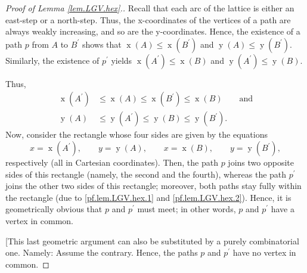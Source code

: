 \documentclass[reqno]{amsart}%
\newcommand{\0}{\phantom{c}}
\theoremstyle{plain}
\theoremstyle{definition}
\numberwithin{equation}{section}
\begin{document}
\begin{proof}
[Proof of Lemma \ref{lem.LGV.hex}.]Recall that each arc of the lattice is
either an east-step or a north-step. Thus, the x-coordinates of the vertices
of a path are always weakly increasing, and so are the y-coordinates. Hence,
the existence of a path $p$ from $A$ to $B^{\prime}$ shows that
$\operatorname*{x}\left(  A\right)  \leq\operatorname*{x}\left(  B^{\prime
}\right)  $ and $\operatorname*{y}\left(  A\right)  \leq\operatorname*{y}%
\left(  B^{\prime}\right)  $. Similarly, the existence of $p^{\prime}$ yields
$\operatorname*{x}\left(  A^{\prime}\right)  \leq\operatorname*{x}\left(
B\right)  $ and $\operatorname*{y}\left(  A^{\prime}\right)  \leq
\operatorname*{y}\left(  B\right)  $.

Thus,%
\begin{align}
\operatorname*{x}\left(  A^{\prime}\right)   &  \leq\operatorname*{x}\left(
A\right)  \leq\operatorname*{x}\left(  B^{\prime}\right)  \leq
\operatorname*{x}\left(  B\right)  \qquad\text{and}\label{pf.lem.LGV.hex.1}\\
\operatorname*{y}\left(  A\right)   &  \leq\operatorname*{y}\left(  A^{\prime
}\right)  \leq\operatorname*{y}\left(  B\right)  \leq\operatorname*{y}\left(
B^{\prime}\right)  . \label{pf.lem.LGV.hex.2}%
\end{align}
Now, consider the rectangle whose four sides are given by the equations%
\[
x=\operatorname*{x}\left(  A^{\prime}\right)  ,\qquad y=\operatorname*{y}%
\left(  A\right)  ,\qquad x=\operatorname*{x}\left(  B\right)  ,\qquad
y=\operatorname*{y}\left(  B^{\prime}\right)  ,
\]
respectively (all in Cartesian coordinates). Then, the path $p$ joins two
opposite sides of this rectangle (namely, the second and the fourth), whereas
the path $p^{\prime}$ joins the other two sides of this rectangle; moreover,
both paths stay fully within the rectangle (due to \eqref{pf.lem.LGV.hex.1}
and \eqref{pf.lem.LGV.hex.2}). Hence, it is geometrically obvious that $p$ and
$p^{\prime}$ must meet; in other words, $p$ and $p^{\prime}$ have a vertex in common.

[This last geometric argument can also be substituted by a purely
combinatorial one. Namely: Assume the contrary. Hence, the paths $p$ and
$p^{\prime}$ have no vertex in common.


\end{proof}
\end{document}
